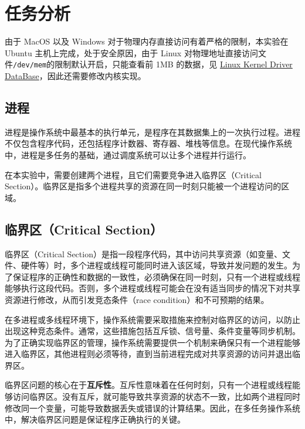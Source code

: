 \maketitle

\section{任务分析}

由于 MacOS 以及 Windows 对于物理内存直接访问有着严格的限制，本实验在 Ubuntu 主机上完成，处于安全原因，由于 Linux 对物理地址直接访问文件\texttt{/dev/mem}的限制默认开启，只能查看前 1MB 的数据，见 \href{https://cateee.net/lkddb/web-lkddb/STRICT_DEVMEM.html}{Linux Kernel Driver DataBase}，因此还需要修改内核实现。

\subsection{进程}

进程是操作系统中最基本的执行单元，是程序在其数据集上的一次执行过程。进程不仅包含程序代码，还包括程序计数器、寄存器、堆栈等信息。在现代操作系统中，进程是多任务的基础，通过调度系统可以让多个进程并行运行。

在本实验中，需要创建两个进程，且它们需要竞争进入临界区（Critical Section）。临界区是指多个进程共享的资源在同一时刻只能被一个进程访问的区域。

\subsection{临界区（Critical Section）}

临界区（Critical Section）是指一段程序代码，其中访问共享资源（如变量、文件、硬件等）时，多个进程或线程可能同时进入该区域，导致并发问题的发生。为了保证程序的正确性和数据的一致性，必须确保在同一时刻，只有一个进程或线程能够执行这段代码。否则，多个进程或线程可能会在没有适当同步的情况下对共享资源进行修改，从而引发竞态条件（race condition）和不可预期的结果。

在多进程或多线程环境下，操作系统需要采取措施来控制对临界区的访问，以防止出现这种竞态条件。通常，这些措施包括互斥锁、信号量、条件变量等同步机制。为了正确实现临界区的管理，操作系统需要提供一个机制来确保只有一个进程能够进入临界区，其他进程则必须等待，直到当前进程完成对共享资源的访问并退出临界区。

临界区问题的核心在于\textbf{互斥性}。互斥性意味着在任何时刻，只有一个进程或线程能够访问临界区。没有互斥，就可能导致共享资源的状态不一致，比如两个进程同时修改同一个变量，可能导致数据丢失或错误的计算结果。因此，在多任务操作系统中，解决临界区问题是保证程序正确执行的关键。


